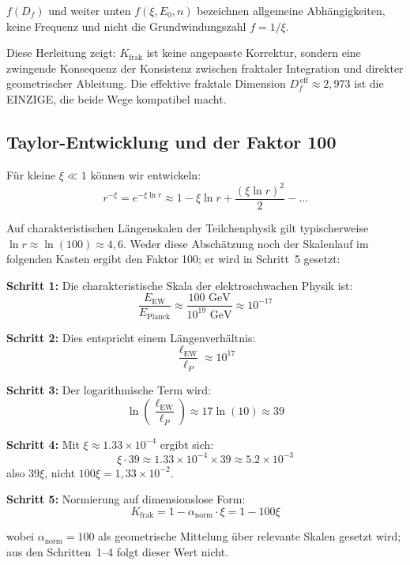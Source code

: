 	$f(D_f)$ und weiter unten $f(\xi, E_0, n)$ bezeichnen allgemeine Abhängigkeiten, keine Frequenz und nicht die Grundwindungszahl $f = 1/\xi$.

	Diese Herleitung zeigt: $K_{\text{frak}}$ ist keine angepasste Korrektur, sondern eine zwingende Konsequenz der Konsistenz zwischen fraktaler Integration und direkter geometrischer Ableitung. Die effektive fraktale Dimension $D_f^{\,\text{eff}} \approx 2{,}973$ ist die EINZIGE, die beide Wege kompatibel macht.
	
	\subsection{Taylor-Entwicklung und der Faktor 100}
	
	Für kleine $\xi \ll 1$ können wir entwickeln:
	\begin{equation}
		r^{-\xi} = e^{-\xi \ln r} \approx 1 - \xi \ln r + \frac{(\xi \ln r)^2}{2} - \ldots
		\label{eq:taylor_expansion}
	\end{equation}
	
	Auf charakteristischen Längenskalen der Teilchenphysik gilt typischerweise $\ln r \approx \ln(100) \approx 4{,}6$. Weder diese Abschätzung noch der Skalenlauf im folgenden Kasten ergibt den Faktor 100; er wird in Schritt~5 gesetzt:
	
	\begin{tcolorbox}[colback=yellow!5!white,colframe=orange!75!black,title={Herkunft des Faktors 100}]
		\textbf{Schritt 1:} Die charakteristische Skala der elektroschwachen Physik ist:
		\begin{equation}
			\frac{E_{\text{EW}}}{E_{\text{Planck}}} \approx \frac{100 \text{ GeV}}{10^{19} \text{ GeV}} \approx 10^{-17}
		\end{equation}
		
		\textbf{Schritt 2:} Dies entspricht einem Längenverhältnis:
		\begin{equation}
			\frac{\ell_{\text{EW}}}{\ell_P} \approx 10^{17}
		\end{equation}
		
		\textbf{Schritt 3:} Der logarithmische Term wird:
		\begin{equation}
			\ln\left(\frac{\ell_{\text{EW}}}{\ell_P}\right) \approx 17 \ln(10) \approx 39
		\end{equation}
		
		\textbf{Schritt 4:} Mit $\xi \approx 1.33 \times 10^{-4}$ ergibt sich:
		\begin{equation}
			\xi \cdot 39 \approx 1.33 \times 10^{-4} \times 39 \approx 5.2 \times 10^{-3}
		\end{equation}
		also $39\xi$, nicht $100\xi = 1{,}33\times10^{-2}$.
		
		\textbf{Schritt 5:} Normierung auf dimensionslose Form:
		\begin{equation}
			K_{\text{frak}} = 1 - \alpha_{\text{norm}} \cdot \xi = 1 - 100\xi
		\end{equation}
		
		wobei $\alpha_{\text{norm}} = 100$ als geometrische Mittelung über relevante Skalen gesetzt wird; aus den Schritten~1--4 folgt dieser Wert nicht.
	\end{tcolorbox}
	
